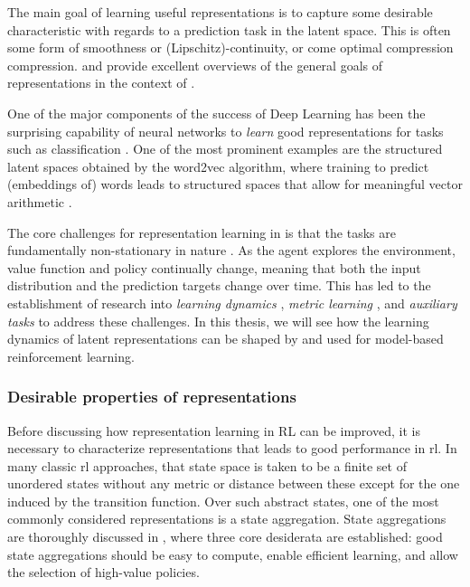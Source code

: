 The main goal of learning useful representations is to capture some desirable characteristic with regards to a prediction task in the latent space.
This is often some form of smoothness or (Lipschitz)-continuity, or come optimal compression compression.
\textcite{abel2020thesis} and \textcite{le2021metrics} provide excellent overviews of the general goals of representations in the context of .

One of the major components of the success of Deep Learning has been the surprising capability of neural networks to \emph{learn} good representations for tasks such as classification \parencite{bengio2012representation}.
One of the most prominent examples are the structured latent spaces obtained by the word2vec algorithm, where training to predict (embeddings of) words leads to structured spaces that allow for meaningful vector arithmetic \parencite{mikolov2013distributed,goldberg2014word2vec}.

The core challenges for representation learning in  is that the tasks are fundamentally non-stationary in nature \parencite{kumar2021implicit,nikishin2022primacy}.
As the agent explores the environment, value function and policy continually change, meaning that both the input distribution and the prediction targets change over time.
This has led to the establishment of research into \emph{learning dynamics} \parencite{lyle2022learning,lyle2022understanding}, \emph{metric learning} \parencite{ferns2011bisimulation,barreto2017successor,borsa2018universal,le2021metrics}, and \emph{auxiliary tasks} \parencite{jaderberg2017reinforcement,bellemare2019geometric,lyle2021effect,farebrother2023protovalue} to address these challenges.
In this thesis, we will see how the learning dynamics of latent representations can be shaped by and used for model-based reinforcement learning.

\subsubsection{Desirable properties of representations}

Before discussing how representation learning in RL can be improved, it is necessary to characterize representations that leads to good performance in \ac{rl}.
In many classic \ac{rl} approaches, that state space is taken to be a finite set of unordered states without any metric or distance between these except for the one induced by the transition function.
Over such abstract states, one of the most commonly considered representations is a state aggregation.
State aggregations are thoroughly discussed in \textcite{abel2020thesis}, where three core desiderata are established: good state aggregations should be easy to compute, enable efficient learning, and allow the selection of high-value policies.

